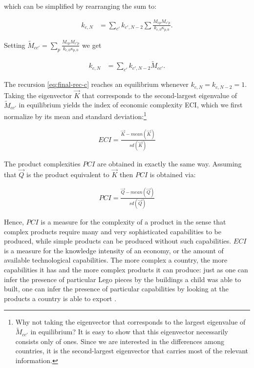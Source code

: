 \documentclass[abstract=on]{scrartcl}
\begin{document}
which can be simplified by rearranging the sum to:

\begin{align}
k_{c,N} &= \sum_{c'} k_{c',N-2}   \sum\frac{M_{cp} M_{c'p}}{k_{c,0} \kappa_{p,0}}. 
\end{align}

Setting $\tilde{M}_{cc'}=\sum_p\frac{M_{cp} M_{c'p}}{k_{c,0} \kappa_{p,0}} $ we get

\begin{align}
k_{c,N} &= \sum_{c'} k_{c',N-2}   \tilde{M}_{cc'}.\label{eq:final-rec-c}
\end{align}

The recursion \eqref{eq:final-rec-c} reaches an equilibrium whenever $k_{c,N}=k_{c,N-2}=1$.
Taking the eigenvector $\vec{K}$ that corresponds to the second-largest eigenvalue of $\tilde{M}_{cc'}$ in equilibrium yields the index of economic complexity ECI, which we first normalize by its mean and standard deviation:\footnote{Why not taking the eigenvector that corresponds to the largest eigenvalue of $\tilde{M}_{cc'}$ in equilibrium? 
It is easy to show that this eigenvector necessarily consists only of ones.
Since we are interested in the differences among countries, it is the second-largest eigenvector that carries most of the relevant information.}

\begin{align}
ECI=\frac{\vec{K}-mean(\vec{K})}{sd(\vec{K})}
\end{align}

The product complexities $PCI$ are obtained in exactly the same way.
Assuming that $\vec{Q}$ is the product equivalent to $\vec{K}$ then $PCI$ is obtained via:

\begin{align}
PCI=\frac{\vec{Q}-mean(\vec{Q})}{sd(\vec{Q})}
\end{align}

Hence, $PCI$ is a measure for the complexity of a product in the sense that complex products require many and very sophisticated capabilities to be produced, while simple products can be produced without such capabilities.
$ECI$ is a measure for the knowledge intensity of an economy, or the amount of available technological capabilities.
The more complex a country, the more capabilities it has and the more complex products it can produce:
just as one can infer the presence of particular Lego pieces by the buildings a child was able to built, one can infer the presence of particular capabilities by looking at the products a country is able to export \citep{Hidalgo:2009be}.
\end{document}
